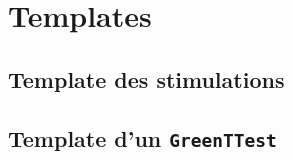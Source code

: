 	\chapter{Templates}\label{annexeTemplate}
	\section{Template des stimulations}
	
	\newpage
	\section{Template d'un \texttt{GreenTTest}}
	
